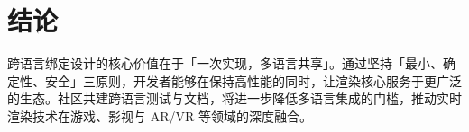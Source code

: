 \chapter{结论}
跨语言绑定设计的核心价值在于「一次实现，多语言共享」。通过坚持「最小、确定性、安全」三原则，开发者能够在保持高性能的同时，让渲染核心服务于更广泛的生态。社区共建跨语言测试与文档，将进一步降低多语言集成的门槛，推动实时渲染技术在游戏、影视与 AR/VR 等领域的深度融合。\par

